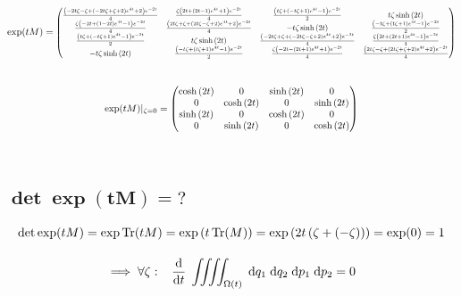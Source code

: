 \documentclass[10pt,a4paper]{article}
\newcommand{\const}[1]{\text{\rmfamily\upshape #1}}
\newcommand{\mat}[1]{
    \begin{pmatrix}
        #1
    \end{pmatrix}
}
\renewcommand{\d}[1]{\;\const{d}#1}
\newcommand{\dd}[2]{\frac{\const{d} #1}{\const{d} #2} \;}
\newcommand{\Tr}{\operatorname{Tr}}
\begin{document}
\begin{gather*}
    \exp(tM) = \scalebox{0.8}{$\mat{\frac{\left(- 2 t \zeta - \zeta + \left(- 2 t \zeta + \zeta + 2\right) e^{4 t} + 2\right) e^{- 2 t}}{4} & \frac{\zeta \left(2 t + \left(2 t - 1\right) e^{4 t} + 1\right) e^{- 2 t}}{4} & \frac{\left(t \zeta + \left(- t \zeta + 1\right) e^{4 t} - 1\right) e^{- 2 t}}{2} & t \zeta \sinh{\left(2 t \right)}\\\frac{\zeta \left(- 2 t + \left(1 - 2 t\right) e^{4 t} - 1\right) e^{- 2 t}}{4} & \frac{\left(2 t \zeta + \zeta + \left(2 t \zeta - \zeta + 2\right) e^{4 t} + 2\right) e^{- 2 t}}{4} & - t \zeta \sinh{\left(2 t \right)} & \frac{\left(- t \zeta + \left(t \zeta + 1\right) e^{4 t} - 1\right) e^{- 2 t}}{2}\\\frac{\left(t \zeta + \left(- t \zeta + 1\right) e^{4 t} - 1\right) e^{- 2 t}}{2} & t \zeta \sinh{\left(2 t \right)} & \frac{\left(- 2 t \zeta + \zeta + \left(- 2 t \zeta - \zeta + 2\right) e^{4 t} + 2\right) e^{- 2 t}}{4} & \frac{\zeta \left(2 t + \left(2 t + 1\right) e^{4 t} - 1\right) e^{- 2 t}}{4}\\- t \zeta \sinh{\left(2 t \right)} & \frac{\left(- t \zeta + \left(t \zeta + 1\right) e^{4 t} - 1\right) e^{- 2 t}}{2} & \frac{\zeta \left(- 2 t - \left(2 t + 1\right) e^{4 t} + 1\right) e^{- 2 t}}{4} & \frac{\left(2 t \zeta - \zeta + \left(2 t \zeta + \zeta + 2\right) e^{4 t} + 2\right) e^{- 2 t}}{4}}$}
    \\[25pt]
    \exp(tM) |_{\zeta=0} = \mat{\cosh{\left(2 t \right)} & 0 & \sinh{\left(2 t \right)} & 0\\0 & \cosh{\left(2 t \right)} & 0 & \sinh{\left(2 t \right)}\\\sinh{\left(2 t \right)} & 0 & \cosh{\left(2 t \right)} & 0\\0 & \sinh{\left(2 t \right)} & 0 & \cosh{\left(2 t \right)}}
    \\[25pt]
\end{gather*}

\subsection{
    \texorpdfstring{
        $\pmb{ \det\exp(tM) = \mathit{?} }$
    }{
        det exp(tM) = ?
    }
}
\begin{gather*}
    \det \exp(tM) = \exp \Tr(tM) =
    \exp\left( t \Tr(M) \right) =
    \exp\left( 2t \left(\zeta+(-\zeta)\right) \right) =
    \exp(0) = 1
    \\[10pt]
    \implies
    \forall \zeta:
    \;\;\;
    \dd{}{t}
    \iiiint_{\Omega(t)}
    \d{q_1} \d{q_2} \d{p_1} \d{p_2} = 0
\end{gather*}
\end{document}
